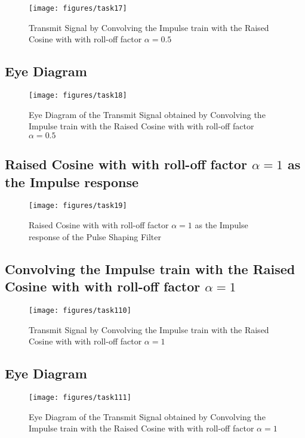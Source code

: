\documentclass[a4paper,11pt]{article}%
\begin{document}
\begin{figure}[H]
	\centering
	\texttt{[image: figures/task17]}
	\caption{Transmit Signal by Convolving the Impulse train with the Raised Cosine with with roll-off factor $\alpha = 0.5$}
\end{figure}

\subsection{Eye Diagram}

\begin{figure}[H]
	\centering
	\texttt{[image: figures/task18]}
	\caption{Eye Diagram of the Transmit Signal obtained by Convolving the Impulse train with the Raised Cosine with with roll-off factor $\alpha = 0.5$}
\end{figure}



\subsection{Raised Cosine with with roll-off factor $\alpha = 1$ as the Impulse response}

\begin{figure}[H]
	\centering
	\texttt{[image: figures/task19]}
	\caption{Raised Cosine with with roll-off factor $\alpha = 1$ as the Impulse response of the Pulse Shaping Filter}
\end{figure}

\subsection{Convolving the Impulse train with the Raised Cosine with with roll-off factor $\alpha = 1$}

\begin{figure}[H]
	\centering
	\texttt{[image: figures/task110]}
	\caption{Transmit Signal by Convolving the Impulse train with the Raised Cosine with with roll-off factor $\alpha = 1$}
\end{figure}

\subsection{Eye Diagram}

\begin{figure}[H]
	\centering
	\texttt{[image: figures/task111]}
	\caption{Eye Diagram of the Transmit Signal obtained by Convolving the Impulse train with the Raised Cosine with with roll-off factor $\alpha = 1$}
\end{figure}
\vfill
\end{document}
